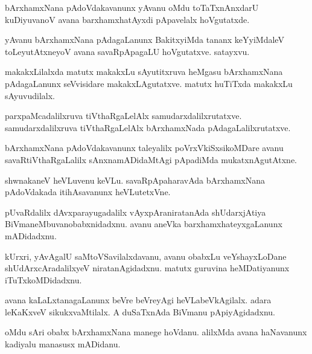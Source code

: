 \begin{mng}
bArxhamxNana pAdoVdakavanunx yAvanu oMdu toTaTxnAnxdarU kuDiyuvanoV avana barxhamxhatAyxdi pApavelalx hoVgutatxde.
\end{mng}

\begin{mng}
yAvanu bArxhamxNana pAdagaLanunx BakitxyiMda tananx keYyiMdaleV toLeyutAtxneyoV avana savaRpApagaLU hoVgutatxve. satayxvu.
\end{mng}

\begin{mng}
makakxLilalxda matutx makakxLu sAyutitxruva heMgasu bArxhamxNana pAdagaLanunx seVvisidare makakxLAgutatxve. matutx huTiTxda makakxLu sAyuvudilalx.
\end{mng}

\begin{mng}
parxpaMcadalilxruva tiVthaRgaLelAlx samudarxdalilxrutatxve. samudarxdalilxruva tiVthaRgaLelAlx bArxhamxNada pAdagaLalilxrutatxve.
\end{mng}

\begin{mng}
bArxhamxNana pAdoVdakavanunx taleyalilx poVrxVkiSxsikoMDare avanu savaRtiVthaRgaLalilx sAnxnamADidaMtAgi pApadiMda mukatxnAgutAtxne.
\end{mng}

\begin{mng}
shwnakaneV heVLuvenu keVLu. savaRpApaharavAda bArxhamxNana pAdoVdakada itihAsavanunx heVLutetxVne.
\end{mng}

\begin{mng}
pUvaRdalilx dAvxparayugadalilx vAyxpAraniratanAda shUdarxjAtiya BiVmaneMbuvanobabxnidadxnu. avanu aneVka barxhamxhateyxgaLanunx mADidadxnu.
\end{mng}

\begin{mng}
kUrxri, yAvAgalU saMtoVSavilalxdavanu, avanu obabxLu veYshayxLoDane shUdArxcAradalilxyeV niratanAgidadxnu. matutx guruvina heMDatiyanunx iTuTxkoMDidadxnu.
\end{mng}

\begin{mng}
avana kaLaLxtanagaLanunx beVre beVreyAgi heVLabeVkAgilalx. adara leKaKxveV sikukxvaMtilalx. A duSaTxnAda BiVmanu pApiyAgidadxnu.
\end{mng}

\begin{mng}
oMdu sAri obabx bArxhamxNana manege hoVdanu. alilxMda avana haNavanunx kadiyalu manasusx mADidanu.
\end{mng}

